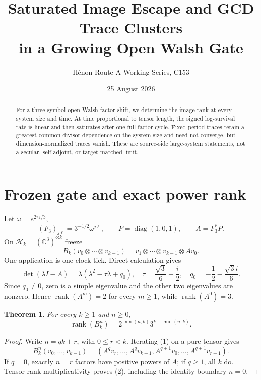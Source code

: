 \documentclass[10pt]{article}
\title{Saturated Image Escape and GCD Trace Clusters\\
in a Growing Open Walsh Gate}
\author{H\'enon Route-A Working Series, C153}
\date{25 August 2026}
\newtheorem{theorem}{Theorem}
\newcommand{\rank}{\operatorname{rank}}
\begin{document}
\maketitle
\vspace{-1.3em}
\begin{abstract}
For a three-symbol open Walsh factor shift, we determine the image rank at
every system size and time.  At time proportional to tensor length, the
signed log-survival rate is linear and then saturates after one full factor
cycle.  Fixed-period traces retain a greatest-common-divisor dependence on the
system size and need not converge, but dimension-normalized traces vanish.  These are source-side
large-system statements, not a secular, self-adjoint, or target-matched limit.
\end{abstract}

\section{Frozen gate and exact power rank}
Let $\omega=e^{2\pi i/3}$,
\[
 (F_3)_{j\ell}=3^{-1/2}\omega^{j\ell},\qquad
 P=\operatorname{diag}(1,0,1),\qquad A=F_3^*P.
\]
On $\mathcal H_k=(\mathbb C^3)^{\otimes k}$ freeze
\begin{equation}
B_k(v_0\otimes\cdots\otimes v_{k-1})
=v_1\otimes\cdots\otimes v_{k-1}\otimes Av_0.       \tag{1}
\end{equation}
One application is one clock tick.  Direct calculation gives
\[
\det(\lambda I-A)=\lambda(\lambda^2-\tau\lambda+q_0),\quad
\tau=\frac{\sqrt3}{6}-\frac i2,\quad
q_0=-\frac12-\frac{\sqrt3 i}{6}.
\]
Since $q_0\ne0$, zero is a simple eigenvalue and the other two eigenvalues
are nonzero.  Hence $\rank(A^m)=2$ for every $m\ge1$, while $\rank(A^0)=3$.

\begin{theorem}
For every $k\ge1$ and $n\ge0$,
\begin{equation}
 \rank(B_k^n)=2^{\min(n,k)}3^{k-\min(n,k)}.           \tag{2}
\end{equation}
\end{theorem}
\begin{proof}
Write $n=qk+r$, with $0\le r<k$.  Iterating (1) on a pure tensor gives
\[
B_k^n(v_0,\ldots,v_{k-1})=
(A^qv_r,\ldots,A^qv_{k-1},A^{q+1}v_0,\ldots,A^{q+1}v_{r-1}).
\]
If $q=0$, exactly $n=r$ factors have positive powers of $A$; if $q\ge1$,
all $k$ do.  Tensor-rank multiplicativity proves (2), including the identity
boundary $n=0$.
\end{proof}
\end{document}
